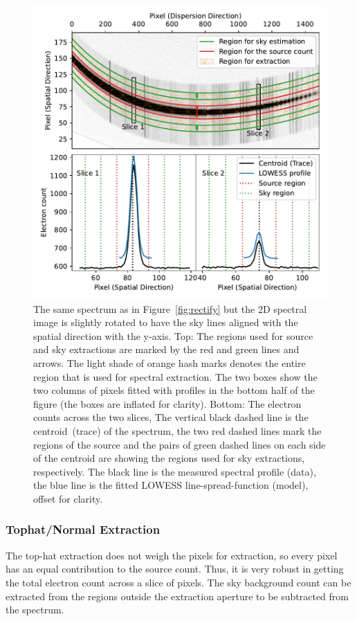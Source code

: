 \documentclass[twocolumn, linenumbers]{aastex631}
\begin{document}
\begin{figure}
    \centering
    \includegraphics[width=\columnwidth]{fig_03_extraction_profile.pdf}
    \caption{The same spectrum as in Figure~\ref{fig:rectify} but the
    2D spectral image is slightly rotated to have the sky lines
    aligned with the spatial direction with the y-axis.
    Top: The regions used for source and sky extractions are marked
    by the red and green lines and arrows. The light shade of orange
    hash marks denotes the entire region that is used for spectral extraction.
    The two boxes show the two columns of pixels fitted with
    profiles in the bottom half of the figure (the boxes are inflated
    for clarity). Bottom: The electron counts across the two slices,
    The vertical black dashed line is the centroid~(trace) of the spectrum,
    the two red dashed lines mark the regions of the source and the
    pairs of green dashed lines on each side of the centroid are
    showing the regions used for sky extractions, respectively. The
    black line is the measured spectral profile (data), the blue
    line is the fitted LOWESS line-spread-function (model), offset for
    clarity.}
    \label{fig:extraction}
\end{figure}

\subsubsection*{Tophat/Normal Extraction}
The top-hat extraction does not weigh the pixels for extraction,
so every pixel has an equal contribution to the source count. Thus,
it is very robust in getting the total electron count across
a slice of pixels. The sky background count can be extracted
from the regions outside the extraction aperture to be
subtracted from the spectrum.
\end{document}
